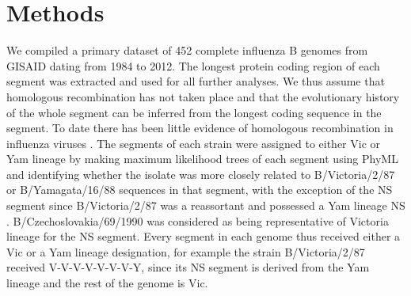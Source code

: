 \documentclass[11pt,oneside,letterpaper]{article}
\begin{document}

\newpage

\section*{Methods}
We compiled a primary dataset of 452 complete influenza B genomes from GISAID \citep{GISAID} dating from 1984 to 2012.
The longest protein coding region of each segment was extracted and used for all further analyses.
We thus assume that homologous recombination has not taken place and that the evolutionary history of the whole segment can be inferred from the longest coding sequence in the segment.
To date there has been little evidence of homologous recombination in influenza viruses \citep{chare2003,boni2008,han2010}.
The segments of each strain were assigned to either Vic or Yam lineage by making maximum likelihood trees of each segment using PhyML \citep{guindon2003} and identifying whether the isolate was more closely related to B/Victoria/2/87 or B/Yamagata/16/88 sequences in that segment, with the exception of the NS segment since B/Victoria/2/87 was a reassortant and possessed a Yam lineage NS \citep{lindstrom1999}.
B/Czechoslovakia/69/1990 was considered as being representative of Victoria lineage for the NS segment.
Every segment in each genome thus received either a Vic or a Yam lineage designation, for example the strain B/Victoria/2/87 received V-V-V-V-V-V-V-Y, since its NS segment is derived from the Yam lineage and the rest of the genome is Vic.
\end{document}
